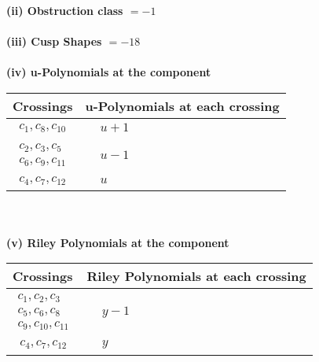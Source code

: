 \documentclass[1p]{elsarticle_modified}
\theoremstyle{definition}
\begin{document}
\flushleft \textbf{(ii) Obstruction class $= -1$}\\~\\
\flushleft \textbf{(iii) Cusp Shapes $= -18$}\\~\\
\newpage\renewcommand{\arraystretch}{1}
\flushleft \textbf{(iv) u-Polynomials at the component}\newline \\
\begin{tabular}{m{50pt}|m{274pt}}
Crossings & \hspace{64pt}u-Polynomials at each crossing \\
\hline $$\begin{aligned}c_{1},c_{8},c_{10}\end{aligned}$$&$\begin{aligned}
&u+1
\end{aligned}$\\
\hline $$\begin{aligned}c_{2},c_{3},c_{5}\\c_{6},c_{9},c_{11}\end{aligned}$$&$\begin{aligned}
&u-1
\end{aligned}$\\
\hline $$\begin{aligned}c_{4},c_{7},c_{12}\end{aligned}$$&$\begin{aligned}
&u
\end{aligned}$\\
\hline
\end{tabular}\\~\\
\newpage\renewcommand{\arraystretch}{1}
\flushleft \textbf{(v) Riley Polynomials at the component}\newline \\
\begin{tabular}{m{50pt}|m{274pt}}
Crossings & \hspace{64pt}Riley Polynomials at each crossing \\
\hline $$\begin{aligned}c_{1},c_{2},c_{3}\\c_{5},c_{6},c_{8}\\c_{9},c_{10},c_{11}\end{aligned}$$&$\begin{aligned}
&y-1
\end{aligned}$\\
\hline $$\begin{aligned}c_{4},c_{7},c_{12}\end{aligned}$$&$\begin{aligned}
&y
\end{aligned}$\\
\hline
\end{tabular}\\~\\
\end{document}
